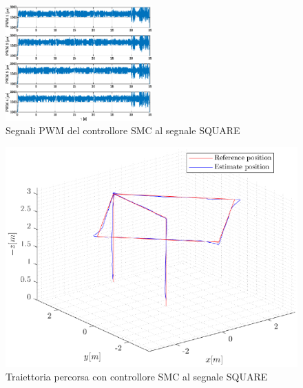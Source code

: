 \begin{figure}
	\centering
	\includegraphics[width=0.5\textwidth]{Simulazioni/Figure/SMC/SQUARE/PWM}
	\caption{Segnali PWM del controllore SMC al segnale SQUARE}
\end{figure}
\begin{figure}
	\centering
	\includegraphics[width=1\textwidth]{Simulazioni/Figure/SMC/SQUARE/Trajectory}
	\caption{Traiettoria percorsa con controllore SMC al segnale SQUARE}
\end{figure}

